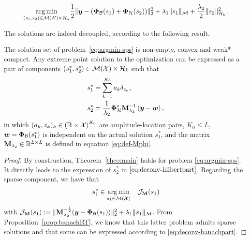 \documentclass[12pt]{article}
\begin{document}
        \begin{equation}
        \label{eq:argmin-sps}
            \underset{(s_1,s_2) \in {\mathcal{M}}({\mathcal{X}}) \times \mathcal{H}_k}{\arg\min} \frac{1}{2} \| \bm{y} - (\bm{\Phi}_\mathcal{B} (s_1) + \bm{\Phi}_\mathcal{H} (s_2)) \|_2^2  + \lambda_{1} \| s_1 \|_{\mathcal{M}} + \frac{\lambda_{2}}{2} \| s_2 \|_{\mathcal{H}_k}^2.
        \end{equation}

        The solutions are indeed decoupled, according to the following result.
        \begin{proposition}
            \label{prop:rt-applied}
            The solution set of problem~\eqref{eq:argmin-sps} is non-empty, convex and weak*-compact.
            Any extreme point solution to the optimization can be expressed as a pair of components $(s_1^*, s_2^*) \in {\mathcal{M}}({\mathcal{X}}) \times \mathcal{H}_k$ such that
            \begin{align}
                s_1^* &= \sum_{k=1}^{K_0} a_k \delta_{z_k}, \label{eq:deconv-banachpart}\\
                s_2^* &=  \frac{1}{\lambda_{2}}\bm{\Phi}_\mathcal{H}^* \mathbf{M}_{\lambda_{2}}^{-1} \left(\bm{y} - \bm{w}\right),\label{eq:deconv-hilbertpart}
            \end{align}
            in which $(a_k, z_k)_k \in \left(\mathbb{R} \times \mathcal{X}\right)^{K_0} $ are amplitude-location pairs, $K_0 \leq L$, $\bm{w} = \bm{\Phi}_\mathcal{B}(s_1^*)$ is independent on the actual solution $s_1^*$, and the matrix $\mathbf{M}_{\lambda_2} \in \mathbb{R}^{L \times L}$ is defined in equation \eqref{eq:def-Mphi}.
        \end{proposition}

        \begin{proof}
            By construction, Theorem~\ref{theo:main} holds for problem \eqref{eq:argmin-sps}. It directly leads to the expression of $s_2^*$ in $\eqref{eq:deconv-hilbertpart}$. Regarding the sparse component, we have that
            \begin{equation*}
                s_1^* \in \underset{ s_1\in{\mathcal{M}}({\mathcal{X}})}{\arg\min} \quad  \mathcal{J}_{\mathbf{M}}(s_1)
            \end{equation*}
            with $\mathcal{J}_{\mathbf{M}}(s_1) := \|\mathbf{M}_{\lambda_{2}}^{-\frac{1}{2}} ( \bm{y} - \bm{\Phi}_\mathcal{B}(s_1)  ) \|_2^2  + \lambda_{1} \| s_1 \|_{\mathcal{M}}$. From Proposition~\ref{prop:banachRT}, we know that this latter problem admits sparse solutions and that some can be expressed according to \eqref{eq:deconv-banachpart}.
        \end{proof}
\end{document}
